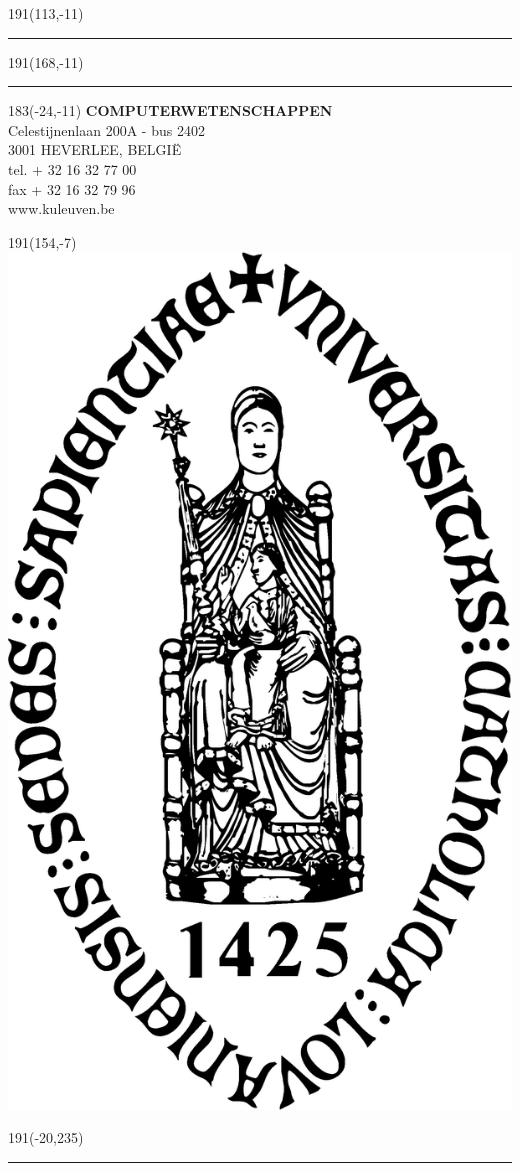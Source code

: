 \documentclass[12pt,a4paper,oneside]{book}
\begin{document}
\thispagestyle{empty}
\sffamily
%
\begin{textblock}{191}(113,-11)
{\color{blueline}\rule{160pt}{5.5pt}}
\end{textblock}
%
\begin{textblock}{191}(168,-11)
{\color{blueline}\rule{5.5pt}{59pt}}
\end{textblock}
%
\begin{textblock}{183}(-24,-11)
\textblockcolour{}
\flushright
\fontsize{7}{7.5}\selectfont
\textbf{COMPUTERWETENSCHAPPEN}\\
Celestijnenlaan 200A - bus 2402\\
3001 HEVERLEE, BELGI\"{E}\\
tel. + 32 16 32 77 00\\
fax + 32 16 32 79 96\\
www.kuleuven.be\\
\end{textblock}
%
\begin{textblock}{191}(154,-7)
\textblockcolour{}
\includegraphics*[height=16.5truemm]{sedes.png}
\end{textblock}
%
\begin{textblock}{191}(-20,235)
{\color{bluetitle}\rule{544pt}{55pt}}
\end{textblock}
\end{document}
